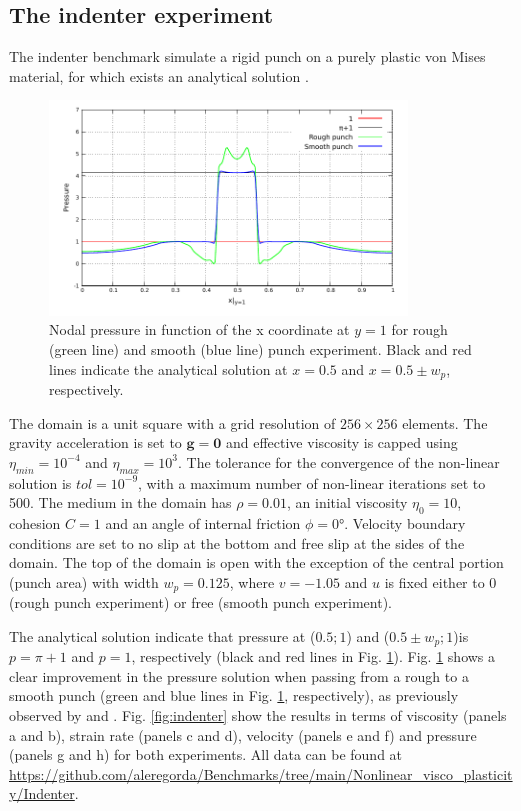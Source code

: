 \subsection{The indenter experiment}\label{sec:indenter}
The indenter benchmark simulate a rigid punch on a purely plastic von Mises material, for which exists an analytical solution \citep{Thieulot2008,Thieulot2014,Glerum2018}.

\begin{figure}
\includegraphics[width=9.5cm]{./Figures/Smooth_Rough.pdf}
\caption{Nodal pressure in function of the x coordinate at $y=1$ for rough (green line) and smooth (blue line) punch experiment. Black and red lines indicate
the analytical solution at $x=0.5$ and $x=0.5 \pm w_p$, respectively.}
\label{fig:smooth_p}
\end{figure}
The domain is a unit square with a grid resolution of $256\times256$ elements. The gravity acceleration is set to $\bm{g}=\bm{0}$ and effective viscosity is capped using $\eta_{min}=10^{-4}$ and $\eta_{max}=10^3$. The tolerance for the convergence of the non-linear solution is $tol=10^{-9}$, with a maximum number of non-linear iterations set to 500. The medium in the domain has $\rho=0.01$, an initial viscosity $\eta_0=10$, cohesion $C=1$ and an angle of internal friction $\phi=0$°. Velocity boundary conditions are set to no slip at the bottom and free slip at the sides of the domain. The top of the domain is open with the exception of the central portion (punch area) with width $w_p=0.125$, where $v=-1.05$ and $u$ is fixed either to 0 (rough punch experiment) or free (smooth punch experiment).

The analytical solution indicate that pressure at ($0.5;1$) and ($0.5 \pm w_p;1$)is $p=\pi +1$ and $p=1$, respectively
(black and red lines in Fig. \ref{fig:smooth_p}). Fig. \ref{fig:smooth_p} shows a clear improvement in the pressure solution when passing from a rough to a
smooth punch (green and blue lines in Fig. \ref{fig:smooth_p}, respectively), as previously observed by \citet{Thieulot2014} and \citet{Glerum2018}.
Fig. \ref{fig:indenter} show the results in terms of viscosity (panels a and b), strain rate (panels c and d), velocity (panels e and f) and pressure
(panels g and h) for both experiments.
All data can be found at \url{https://github.com/aleregorda/Benchmarks/tree/main/Nonlinear_visco_plasticity/Indenter}.

